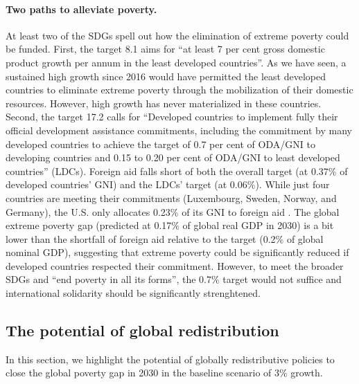 \paragraph{Two paths to alleviate poverty.}
At least two of the SDGs spell out how the elimination of extreme poverty could be funded. %
First, the target 8.1 aims for ``at least 7 per cent gross domestic product growth per annum in the least developed countries''. As we have seen, a sustained high growth since 2016 would have permitted the least developed countries to eliminate extreme poverty through the mobilization of their domestic resources. However, high growth has never materialized in these countries. 
Second, the target 17.2 calls for ``Developed countries to implement fully their official development assistance commitments, including the commitment by many developed countries to achieve the target of 0.7 per cent of ODA/GNI to developing countries and 0.15 to 0.20 per cent of ODA/GNI to least developed countries'' (LDCs). Foreign aid falls short of both the overall target (at 0.37\% of developed countries' GNI) and the LDCs' target (at 0.06\%). While just four countries are meeting their commitments (Luxembourg, Sweden, Norway, and Germany), the U.S. only allocates 0.23\% of its GNI to foreign aid \citep{oecd_oda_2023}. The global extreme poverty gap (predicted at 0.17\% of global real GDP in 2030) is a bit lower than the shortfall of foreign aid relative to the target (0.2\% of global nominal GDP), suggesting that extreme poverty could be significantly reduced if developed countries respected their commitment. %
However, to meet the broader SDGs and ``end poverty in all its forms'', the 0.7\% target would not suffice and international solidarity should be significantly strenghtened. %

\subsection{The potential of global redistribution} %

In this section, we highlight the potential of globally redistributive policies to close the global poverty gap in 2030 in the baseline scenario of 3\% growth. %

